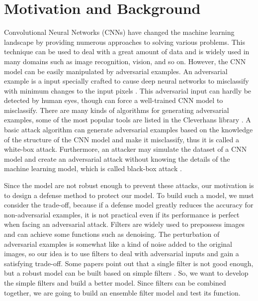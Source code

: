 \section{Motivation and Background} \label{s:motivationAndBackground}
Convolutional Neural Networks (CNNs) have changed the machine learning landscape by providing numerous approaches to solving various problems. This technique can be used to deal with a great amount of data and is widely used in many domains such as image recognition, vision, and so on. However, the CNN model can be easily manipulated by adversarial examples. An adversarial example is a input specially crafted to cause deep neural networks to misclassify with minimum changes to the input pixels \cite{adversarial}. This adversarial input can hardly be detected by human eyes, though can force a well-trained CNN model to misclassify. There are many kinds of algorithms for generating adversarial examples, some of the most popular tools are listed in the Cleverhans library \cite{papernot2018cleverhans}. A basic attack algorithm can generate adversarial examples based on the knowledge of the structure of the CNN model and make it misclassify, thus it is called a white-box attack. Furthermore, an attacker may simulate the dataset of a CNN model and create an adversarial attack without knowing the details of the machine learning model, which is called black-box attack \cite{blackbox}.

Since the model are not robust enough to prevent these attacks, our motivation is to design a defense method to protect our model. To build such a model, we must consider the trade-off, because if a defense model greatly reduces the accuracy for non-adversarial examples, it is not practical even if its performance is perfect when facing an adversarial attack. Filters are widely used to prepossess images and can achieve some functions such as denoising. The perturbation of adversarial examples is somewhat like a kind of noise added to the original images, so our idea is to use filters to deal with adversarial inputs and gain a satisfying trade-off. Some papers point out that a single filter is not good enough, but a robust model can be built based on simple filters \cite{ComplexFilter}. So, we want to develop the simple filters and build a better model. Since filters can be combined together, we are going to build an ensemble filter model and test its function.
